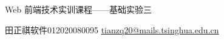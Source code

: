 
\vspace*{\fill}

\begin{center}

    \Huge Web 前端技术实训课程——基础实验三

    \vspace{2em}
    
    \normalsize

    田正祺\hspace{1em}软件01\hspace{1em}2020080095 \hspace{1em}\href{mailto:tianzq20@mails.tsinghua.edu.cn}{tianzq20@mails.tsinghua.edu.cn}
    
\end{center}

\vspace*{\fill}

\newpage

